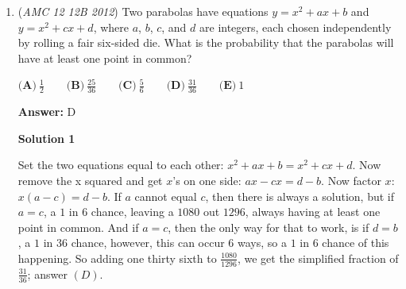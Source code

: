 \begin{enumerate}
 


 



\textbf{Solution 4}

We consider two cases, and subtract their overcount.

 
Case $1$: Consecutive $0$s 

 If we have one consecutive $0$, then we have $20$ ways.If we have two consecutive $0$s, then we have $19$ ways by thinking of the two consecutives as a block.Continuing this pattern, if we have twenty consecutive $0$s, then we have only $1$ way.

 Therefore, we have $20+19+\cdots+1=\binom{21}{2}$ ways for this case. 

 
Case $2$: Consecutive $1$s

 Notice that if we just swap every $0$ to a $1$ in the previous case, we also have a valid arrangement.Hence, we also have $20+19+\cdots+1=\binom{21}{2}$ ways for this case.

 
Overcount: Notice that we can have BOTH the $0$s and the $1$s be consecutive. These are the cases $01111...$, $00111...$, $000111...$, ..., $000...0000$ which gives us $20$ ways being overcounted. If we invert the $0$s to $1$s, we similarly have $20$ more ways, hence we need to subtract $40$ from our total count. (Note: this method of overcounting subtracts out the all $0$s and the all $1$s case since the problem implies that there needs to be at least one of each)

 
So we have $210 + 210 - 40 = 380$ ways which gives us $\boxed{\textbf{(D)}\ 380}$. 

 


 


	\item (\textit{AMC 12 12B 2012}) Two parabolas have equations $y= x^2 + ax +b$ and $y= x^2 + cx +d$, where $a$, $b$, $c$, and $d$ are integers, each chosen independently by rolling a fair six-sided die. What is the probability that the parabolas will have at least one point in common?


 $\textbf{(A)}\ \frac{1}{2}\qquad\textbf{(B)}\ \frac{25}{36}\qquad\textbf{(C)}\ \frac{5}{6}\qquad\textbf{(D)}\ \frac{31}{36}\qquad\textbf{(E)}\ 1$

 \textbf{Answer: }D



\textbf{Solution 1}

Set the two equations equal to each other: $x^2 + ax + b = x^2 + cx + d$. Now remove the x squared and get $x$'s on one side: $ax-cx=d-b$. Now factor $x$: $x(a-c)=d-b$. If $a$ cannot equal $c$, then there is always a solution, but if $a=c$, a $1$ in $6$ chance, leaving a $1080$ out $1296$, always having at least one point in common. And if $a=c$, then the only way for that to work, is if $d=b$, a $1$ in $36$ chance, however, this can occur $6$ ways, so a $1$ in $6$ chance of this happening. So adding one  thirty sixth to $\frac{1080}{1296}$, we get the simplified fraction of $\frac{31}{36}$; answer $\boxed{(D)}$.


\end{enumerate}
